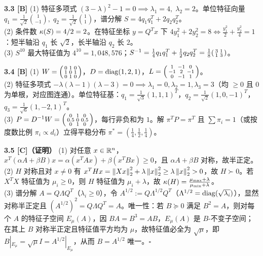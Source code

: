 \textbf{3.3 [B]}
(1) 特征多项式 $(3-\lambda)^2 - 1 = 0 \implies \lambda_1=4,\; \lambda_2=2$。单位特征向量 $q_1 = \frac{1}{\sqrt{2}}\binom{1}{-1},\; q_2 = \frac{1}{\sqrt{2}}\binom{1}{1}$，谱分解 $S = 4 q_1 q_1^T + 2 q_2 q_2^T$。\\
(2) 条件数 $\kappa(S) = 4/2 = 2$。在特征坐标 $y = Q^T x$ 下 $4y_1^2 + 2y_2^2 = 8 \iff \frac{y_1^2}{2} + \frac{y_2^2}{4} = 1$：短半轴沿 $q_1$ 长 $\sqrt{2}$，长半轴沿 $q_2$ 长 $2$。\\
(3) $S^{10}$ 最大特征值为 $4^{10} = 1{,}048{,}576$；$S^{-1} = \frac{1}{4}q_1 q_1^T + \frac{1}{2}q_2 q_2^T = \frac{1}{8}\begin{psmallmatrix}3&1\\1&3\end{psmallmatrix}$。

\textbf{3.4 [B]}
(1) $W = \begin{psmallmatrix}0&1&0\\1&0&1\\0&1&0\end{psmallmatrix}$，$D = \operatorname{diag}(1,2,1)$，$L = \begin{psmallmatrix}1&-1&0\\-1&2&-1\\0&-1&1\end{psmallmatrix}$。\\
(2) 特征多项式 $-\lambda(\lambda-1)(\lambda-3)=0 \implies \lambda_1=0, \lambda_2=1, \lambda_3=3$（均 $\ge 0$ 且 $0$ 为单根，对应图连通）。单位特征基：$q_1 = \frac{1}{\sqrt{3}}(1,1,1)^T$，$q_2 = \frac{1}{\sqrt{2}}(1,0,-1)^T$，$q_3 = \frac{1}{\sqrt{6}}(1,-2,1)^T$。\\
(3) $P = D^{-1}W = \begin{psmallmatrix}0&1&0\\0.5&0&0.5\\0&1&0\end{psmallmatrix}$，每行非负和为 $1$。解 $\pi^T P = \pi^T$ 且 $\sum \pi_i = 1$（或按度数比例 $\pi_i \propto d_i$）立得平稳分布 $\pi^* = (\frac{1}{4}, \frac{1}{2}, \frac{1}{4})$。

\textbf{3.5 [C]（证明）}
(1) 对任意 $x\in\mathbb{R}^n$，$x^T(\alpha A+\beta B)x = \alpha(x^TAx) + \beta(x^TBx) \ge 0$，且 $\alpha A+\beta B$ 对称，故半正定。\\
(2) $H$ 对称且对 $x\neq 0$ 有 $x^T H x = \left\|Xx\right\|_2^2 + \lambda\left\|x\right\|_2^2 \ge \lambda\left\|x\right\|_2^2 > 0$，故 $H\succ 0$。若 $X^TX$ 特征值为 $\mu_i \ge 0$，则 $H$ 特征值为 $\mu_i+\lambda$，故 $\kappa(H) = \frac{\mu_{\max}+\lambda}{\mu_{\min}+\lambda}$。\\
(3) 谱分解 $A = Q\Lambda Q^T$（$\lambda_i\ge 0$），令 $A^{1/2} := Q\Lambda^{1/2}Q^T$（$\Lambda^{1/2}=\operatorname{diag}(\sqrt{\lambda_i})$），显然对称半正定且 $(A^{1/2})^2 = Q\Lambda Q^T = A$。唯一性：若 $B\succeq 0$ 满足 $B^2 = A$，则对每个 $A$ 的特征子空间 $E_\mu(A)$，因 $BA=B^3=AB$，$E_\mu(A)$ 是 $B$-不变子空间；在其上 $B$ 对称半正定且特征值平方均为 $\mu$，故特征值必全为 $\sqrt{\mu}$，即 $B|_{E_\mu} = \sqrt{\mu} I = A^{1/2}|_{E_\mu}$，从而 $B = A^{1/2}$ 唯一。$\square$

